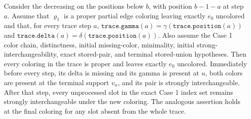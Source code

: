 \begin{helper}
Consider the decreasing  on the
positions below \(b\), with position \(b-1-a\) at step \(a\).  Assume that
\(\varrho_1\) is a proper partial edge coloring leaving exactly \(e_0\)
uncolored and that, for every trace step \(a\),
\(\mathtt{trace.gamma}(a)=\gamma(\mathtt{trace.position}(a))\) and
\(\mathtt{trace.delta}(a)=\delta(\mathtt{trace.position}(a))\).  Also assume
the Case 1 color chain, distinctness, initial missing-color, minimality,
initial strong-interchangeability, exact stored-pair, and terminal
stored-union hypotheses.  Then every coloring in the trace is proper and
leaves exactly \(e_0\) uncolored.  Immediately before every step, its delta
is missing and its gamma is present at \(u\), both colors are present at the
terminal support \(v_n\), and its pair is strongly interchangeable.  After
that step, every unprocessed slot in the exact Case 1 index set remains
strongly interchangeable under the new coloring.  The analogous assertion
holds at the final coloring for any slot absent from the whole trace.
\end{helper}
